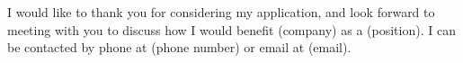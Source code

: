I would like to thank you for considering my application, and look forward to meeting with you to discuss how I would benefit (company) as a (position). I can be contacted by phone at (phone number) or email at (email).